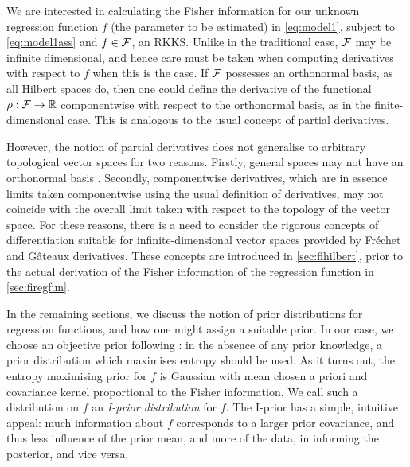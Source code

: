 \documentclass[showframe,11pt,twoside,openright]{report}
\begin{document}
\label{chapter3}
\thispagestyle{chapterthree}

\newcommand{\funder}{\rho}  %

We are interested in calculating the Fisher information for our unknown regression function $f$ (the parameter to be estimated) in \cref{eq:model1}, subject to \cref{eq:model1ass} and $f\in{\mathcal F}$, an RKKS.
Unlike in the traditional case, ${\mathcal F}$ may be infinite dimensional, and hence care must be taken when computing derivatives with respect to $f$ when this is the case.
If ${\mathcal F}$ possesses an orthonormal basis, as all Hilbert spaces do, then one could define the derivative of the functional $\funder:\cF\to\bbR$ componentwise with respect to the orthonormal basis, as in the finite-dimensional case.
This is analogous to the usual concept of   partial derivatives.

However, the notion of partial derivatives does not generalise to arbitrary topological vector spaces for two reasons.
Firstly, general spaces may not have an orthonormal basis \citep[Sec. 5, p. 76]{tapia1971diff}.
Secondly, componentwise derivatives, which are in essence limits taken componentwise using the usual definition of derivatives, may not coincide with the overall limit taken with respect to the topology of the vector space.
For these reasons, there is a need to consider the rigorous concepts of differentiation suitable for infinite-dimensional vector spaces provided by Fréchet and Gâteaux derivatives.
These concepts are introduced in \cref{sec:fihilbert}, prior to the actual derivation of the Fisher information of the regression function in \cref{sec:firegfun}.

In the remaining sections, we discuss the notion of prior distributions for regression functions, and how one might assign a suitable prior.
In our case, we choose an objective prior following \citep{jaynes1957a,jaynes1957b,jaynes2003probability}: in the absence of any prior knowledge, a prior distribution which maximises entropy should be used.
As it turns out, the entropy maximising prior for $f$ is Gaussian with mean chosen a priori and covariance kernel proportional to the Fisher information.
We call such a distribution on $f$ an \emph{I-prior distribution} for $f$.
The I-prior has a simple, intuitive appeal: much information about $f$ corresponds to a larger prior covariance, and thus less influence of the prior mean, and more of the data, in informing the posterior, and vice versa.
\end{document}

